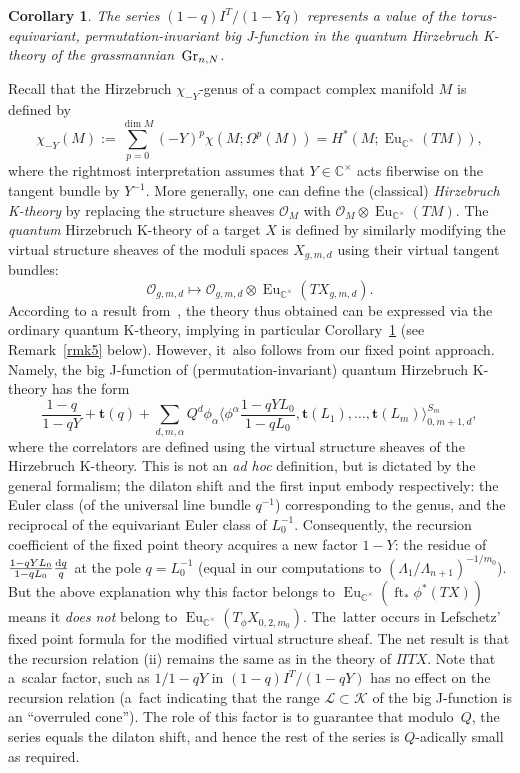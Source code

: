 \documentclass[pdftex]{sigma}
\numberwithin{equation}{section}
\newtheorem{Corollary}[Theorem]{Corollary}
\def\K{\mathcal K}
\def\L{\mathcal L}
\def\O{\mathcal O}
\def\CC{\mathbb C}
\def\t{{\mathbf t}}
\def\lan{\langle}
\def\ran{\rangle}
\def\ft{\operatorname{ft}}
\def\Eu{\operatorname{Eu}}
\begin{document}
\begin{Corollary}\label{cor1}
The series $(1-q) I^T /(1-Yq)$ represents a value of the torus-equivariant, per\-mu\-ta\-tion-invariant big J-function in the quantum Hirzebruch K-theory of the grassman\-nian~${\rm Gr}_{n,N}$.
\end{Corollary}

Recall that the Hirzebruch $\chi_{-Y}$-genus of a compact complex manifold $M$ is defined by
\[
\chi_{-Y}(M):=\sum_{p=0}^{\dim M} (-Y)^p \chi (M; \Omega^p(M)) = H^*(M; \Eu_{\CC^{\times}}(TM)),
\]
where the rightmost interpretation assumes that $Y\in \CC^{\times}$ acts fiberwise on the tangent bundle by $Y^{-1}$. More generally, one can define the (classical) {\em Hirzebruch K-theory} by replacing the structure sheaves $\O_M$ with $\O_M\otimes \Eu_{\CC^{\times}}(TM)$. The {\em quantum} Hirzebruch K-theory of a target $X$ is defined by similarly modifying the virtual structure sheaves of the moduli spaces $X_{g,m,d}$ using their virtual tangent bundles:
\[
\O_{g,m,d} \mapsto \O_{g,m,d} \otimes \Eu_{\CC^{\times}}(T X_{g,m,d}).
\]
According to a result from~\cite{G-H}, the theory thus obtained can be expressed via the ordinary quantum K-theory, implying in particular Corollary~\ref{cor1} (see Remark~\ref{rmk5} below). However, it~also follows from our fixed point approach. Namely, the big J-function of (permutation-invariant) quantum Hirzebruch K-theory has the form
\[
\frac{1-q}{1-qY}+\t(q)+\sum_{d,m,\alpha}Q^d\phi_{\alpha}\bigg\lan \phi^{\alpha} \frac{1-qYL_0}{1-qL_0},\t(L_1),\dots, \t(L_m)\bigg\ran^{S_m}_{0,m+1,d},
\]
where the correlators are defined using the virtual structure sheaves of the Hirzebruch K-theory. This is not an {\em ad hoc} definition, but is dictated by the general formalism; the dilaton shift and the first input embody respectively: the Euler class (of the universal line bundle $q^{-1}$) corresponding to the genus, and the reciprocal of the equivariant Euler class of $L_0^{-1}$. Consequently, the recursion coefficient of the fixed point theory acquires a new factor $1-Y$: the residue of $\frac{1-qYL_0}{1-qL_0} \frac{{\rm d}q}{q}$ at the pole $q=L_0^{-1}$ (equal in our computations to $(\Lambda_1/\Lambda_{n+1})^{-1/m_0}$). But the above explanation why this factor belongs to $\Eu_{\CC^{\times}}(\ft_*\phi^*(TX))$ means it {\em does not} belong to $\Eu_{\CC^{\times}}(T_{\phi}X_{0,2,m_0})$. The~latter occurs in Lefschetz' fixed point formula for the modified virtual structure sheaf. The net result is that the recursion relation (ii) remains the same as in the theory of $\Pi T X$. Note that a~scalar factor, such as $1/1-qY$ in $(1-q) I^T/(1-qY)$ has no effect on the recursion relation (a~fact indicating that the range $\L\subset \K$ of the big J-function is an ``overruled cone''). The role of this factor is to guarantee that modulo~$Q$, the series equals the dilaton shift, and hence the rest of the series is $Q$-adically small as required.
\end{document}
